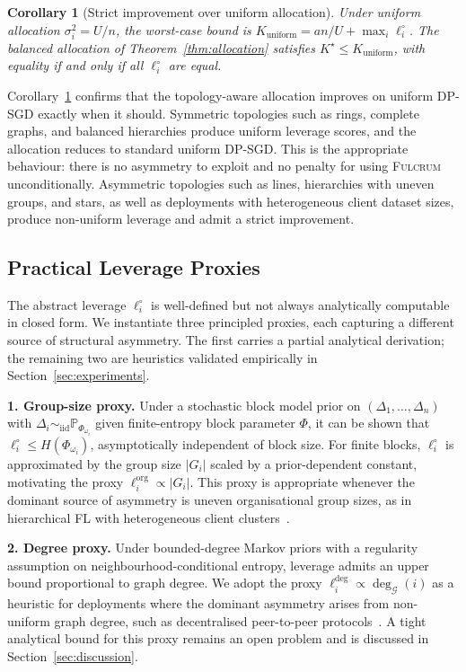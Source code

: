 \documentclass[letterpaper,journal]{IEEEtran}
\newtheorem{corollary}[theorem]{Corollary}
\newcommand{\Fulcrum}{\textsc{Fulcrum}\xspace}
\begin{document}
\begin{corollary}[Strict improvement over uniform allocation]
\label{cor:strict}
Under uniform allocation $\sigma_i^2 = U/n$, the worst-case bound
is $K_{\mathrm{uniform}} = an/U + \max_i \ell_i^\circ$. The
balanced allocation of Theorem~\ref{thm:allocation} satisfies
$K^\star \leq K_{\mathrm{uniform}}$, with equality if and only if
all $\ell_i^\circ$ are equal.
\end{corollary}

Corollary~\ref{cor:strict} confirms that the topology-aware
allocation improves on uniform DP-SGD exactly when it should.
Symmetric topologies such as rings, complete graphs, and balanced hierarchies produce uniform leverage scores, and the allocation reduces to standard uniform DP-SGD. This is the appropriate behaviour: there is no asymmetry to exploit and no penalty for using \Fulcrum unconditionally. Asymmetric topologies such as lines, hierarchies with uneven groups, and stars, as well as deployments with heterogeneous client dataset sizes, produce non-uniform leverage and admit a strict improvement.

\subsection{Practical Leverage Proxies}
\label{sec:defense-proxies}

The abstract leverage $\ell_i^\circ$ is well-defined but not always
analytically computable in closed form. We instantiate three
principled proxies, each capturing a different source of structural
asymmetry. The first carries a partial analytical derivation; the
remaining two are heuristics validated empirically in
Section~\ref{sec:experiments}.\smallskip

\noindent\textbf{1. Group-size proxy.} Under a stochastic block model
prior on $(\Delta_1,\ldots,\Delta_n)$ with
$\Delta_i \sim_{\mathrm{iid}} \mathbb{P}_{\Phi_{\omega_i}}$ given
finite-entropy block parameter $\Phi$, it can be shown that
$\ell_i^\circ \leq H(\Phi_{\omega_i})$, asymptotically independent
of block size. For finite blocks, $\ell_i^\circ$ is approximated by
the group size $|G_i|$ scaled by a prior-dependent constant,
motivating the proxy $\ell_i^{\mathrm{org}} \propto |G_i|$. This
proxy is appropriate whenever the dominant source of asymmetry is
uneven organisational group sizes, as in hierarchical FL with
heterogeneous client clusters~\cite{briggs2020hierarchical}.\smallskip

\noindent\textbf{2. Degree proxy.} Under bounded-degree Markov priors
with a regularity assumption on neighbourhood-conditional entropy,
leverage admits an upper bound proportional to graph degree. We adopt
the proxy $\ell_i^{\mathrm{deg}} \propto \deg_{\mathcal{G}}(i)$ as
a heuristic for deployments where the dominant asymmetry arises from
non-uniform graph degree, such as decentralised peer-to-peer
protocols~\cite{roy2019braintorrent,hegedus2021decentralized,beilharz2021dag}.
A tight analytical bound for this proxy remains an open problem and
is discussed in Section~\ref{sec:discussion}.\smallskip
\end{document}
